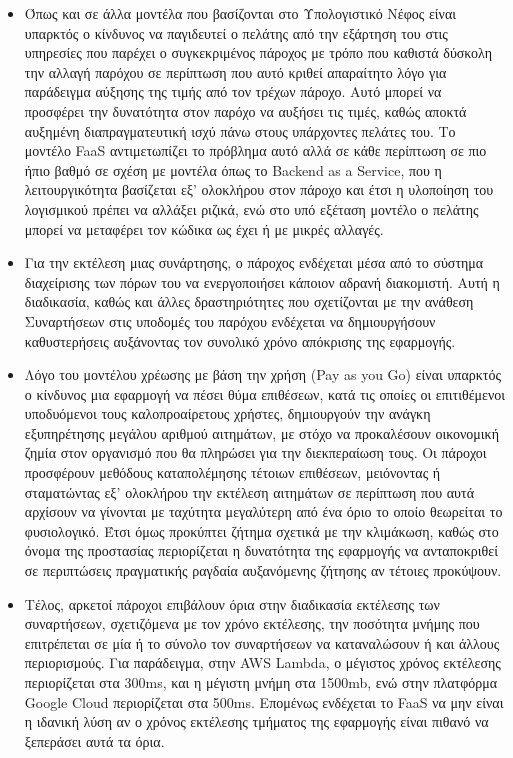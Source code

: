 \documentclass{article}
\begin{document}
\begin{itemize}
\item Όπως και σε άλλα μοντέλα που βασίζονται στο Υπολογιστικό Νέφος είναι υπαρκτός ο κίνδυνος να παγιδευτεί ο πελάτης από την εξάρτηση του στις υπηρεσίες που παρέχει ο συγκεκριμένος πάροχος με τρόπο που καθιστά δύσκολη την αλλαγή παρόχου σε περίπτωση που αυτό κριθεί απαραίτητο λόγο για παράδειγμα αύξησης της τιμής από τον τρέχων πάροχο. Αυτό μπορεί να προσφέρει την δυνατότητα στον παρόχο να αυξήσει τις τιμές, καθώς αποκτά αυξημένη διαπραγματευτική ισχύ πάνω στους υπάρχοντες πελάτες του. Το μοντέλο FaaS αντιμετωπίζει το πρόβλημα αυτό αλλά σε κάθε περίπτωση σε πιο ήπιο βαθμό σε σχέση με μοντέλα όπως το Backend as a Service, που η λειτουργικότητα βασίζεται εξ' ολοκλήρου στον πάροχο και έτσι η υλοποίηση του λογισμικού πρέπει να αλλάξει ριζικά, ενώ στο υπό εξέταση μοντέλο ο πελάτης μπορεί να μεταφέρει τον κώδικα ως έχει ή με μικρές αλλαγές.
\item Για την εκτέλεση μιας συνάρτησης, ο πάροχος ενδέχεται μέσα από το σύστημα διαχείρισης των πόρων του να ενεργοποιήσει κάποιον αδρανή διακομιστή. Αυτή η διαδικασία, καθώς και άλλες δραστηριότητες που σχετίζονται με την ανάθεση Συναρτήσεων στις υποδομές του παρόχου ενδέχεται να δημιουργήσουν καθυστερήσεις αυξάνοντας τον συνολικό χρόνο απόκρισης της εφαρμογής.
\item Λόγο του μοντέλου χρέωσης με βάση την χρήση (Pay as you Go) είναι υπαρκτός ο κίνδυνος μια εφαρμογή να πέσει θύμα επιθέσεων, κατά τις οποίες οι επιτιθέμενοι υποδυόμενοι τους καλοπροαίρετους χρήστες, δημιουργούν την ανάγκη εξυπηρέτησης μεγάλου αριθμού αιτημάτων, με στόχο να προκαλέσουν οικονομική ζημία στον οργανισμό που θα πληρώσει για την διεκπεραίωση τους. Οι πάροχοι προσφέρουν μεθόδους καταπολέμησης τέτοιων επιθέσεων, μειόνοντας ή σταματώντας εξ' ολοκλήρου την εκτέλεση αιτημάτων σε περίπτωση που αυτά αρχίσουν να γίνονται με ταχύτητα μεγαλύτερη από ένα όριο το οποίο θεωρείται το φυσιολογικό. Έτσι όμως προκύπτει ζήτημα σχετικά με την κλιμάκωση, καθώς στο όνομα της προστασίας περιορίζεται η δυνατότητα της εφαρμογής να ανταποκριθεί σε περιπτώσεις πραγματικής ραγδαία αυξανόμενης ζήτησης αν τέτοιες προκύψουν.
\item Τέλος, αρκετοί πάροχοι επιβάλουν όρια στην διαδικασία εκτέλεσης των συναρτήσεων, σχετιζόμενα με τον χρόνο εκτέλεσης, την ποσότητα μνήμης που επιτρέπεται σε μία ή το σύνολο τον συναρτήσεων να καταναλώσουν ή και άλλους περιορισμούς. Για παράδειγμα, στην AWS Lambda, ο μέγιστος χρόνος εκτέλεσης περιορίζεται στα 300ms, και η μέγιστη μνήμη στα 1500mb, ενώ στην πλατφόρμα Google Cloud περιορίζεται στα 500ms. Επομένως ενδέχεται το FaaS να μην είναι η ιδανική λύση αν ο χρόνος εκτέλεσης τμήματος της εφαρμογής είναι πιθανό να ξεπεράσει αυτά τα όρια. 
\end{itemize}
\end{document}
